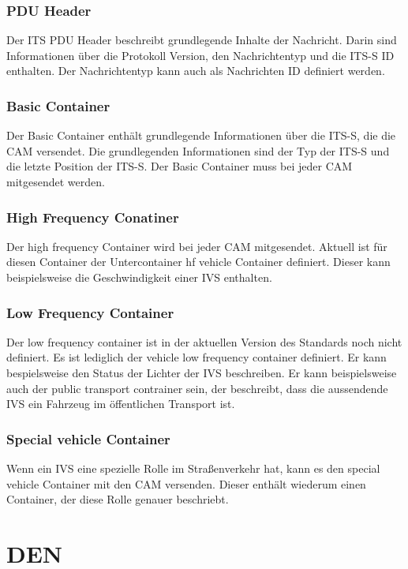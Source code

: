 \subsubsection{PDU Header \label{facilitylayer_PduHeader}}
Der \ac{ITS} \ac{PDU} Header beschreibt grundlegende Inhalte der Nachricht. Darin sind Informationen über die Protokoll Version, den Nachrichtentyp und die \ac{ITS-S} \ac{ID} enthalten. Der Nachrichtentyp kann auch als Nachrichten \ac{ID} definiert werden. 


\subsubsection{Basic Container}
Der Basic Container enthält grundlegende Informationen über die \ac{ITS-S}, die die \ac{CAM} versendet. Die grundlegenden Informationen sind der Typ der \ac{ITS-S} und die letzte Position der \ac{ITS-S}. Der Basic Container muss bei jeder \ac{CAM} mitgesendet werden.

\subsubsection{High Frequency Conatiner}
Der high frequency Container wird bei jeder \ac{CAM} mitgesendet. Aktuell ist für diesen Container der Untercontainer hf vehicle Container definiert. Dieser kann beispielsweise die Geschwindigkeit einer \ac{IVS} enthalten. 


\subsubsection{Low Frequency Container}
Der low frequency container ist in der aktuellen Version des Standards \cite{en302637-2} noch nicht definiert. Es ist lediglich der vehicle low frequency container definiert. Er kann bespielsweise den Status der Lichter der \ac{IVS} beschreiben. Er kann beispielsweise auch der public transport contrainer sein, der beschreibt, dass die aussendende \ac{IVS} ein Fahrzeug im öffentlichen Transport ist.

\subsubsection{Special vehicle Container}
Wenn ein \ac{IVS} eine spezielle Rolle im Straßenverkehr hat, kann es den special vehicle Container mit den \ac{CAM} versenden. Dieser enthält wiederum einen Container, der diese Rolle genauer beschriebt. 
\section{DEN\label{sec:den}}
